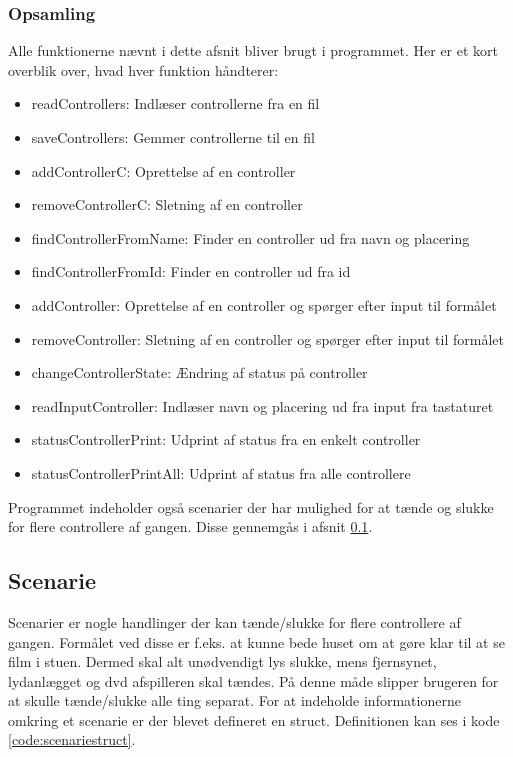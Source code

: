 \subsubsection*{Opsamling}
Alle funktionerne nævnt i dette afsnit bliver brugt i programmet. Her er et kort overblik over, hvad hver funktion håndterer:
\begin{itemize}
    \item readControllers: Indlæser controllerne fra en fil
    \item saveControllers: Gemmer controllerne til en fil
    \item addControllerC: Oprettelse af en controller
    \item removeControllerC: Sletning af en controller
    \item findControllerFromName: Finder en controller ud fra navn og placering
    \item findControllerFromId: Finder en controller ud fra id
    \item addController: Oprettelse af en controller og spørger efter input til formålet
    \item removeController: Sletning af en controller og spørger efter input til formålet
    \item changeControllerState: Ændring af status på controller
    \item readInputController: Indlæser navn og placering ud fra input fra tastaturet
    \item statusControllerPrint: Udprint af status fra en enkelt controller
    \item statusControllerPrintAll: Udprint af status fra alle controllere
\end{itemize}

Programmet indeholder også scenarier der har mulighed for at tænde og slukke for flere controllere af gangen. Disse gennemgås i afsnit \ref{sec:implemscen}.


\subsection{Scenarie}\label{sec:implemscen}
Scenarier er nogle handlinger der kan tænde/slukke for flere controllere af gangen. Formålet ved disse er f.eks. at kunne bede huset om at gøre klar til at se film i stuen. Dermed skal alt unødvendigt lys slukke, mens fjernsynet, lydanlægget og dvd afspilleren skal tændes. På denne måde slipper brugeren for at skulle tænde/slukke alle ting separat. For at indeholde informationerne omkring et scenarie er der blevet defineret en struct. Definitionen kan ses i kode \ref{code:scenariestruct}.

